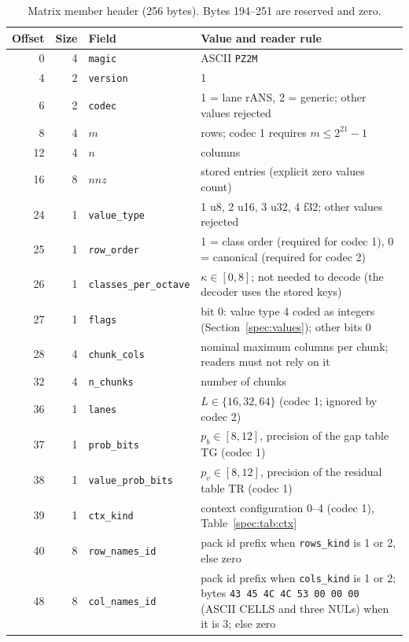 \begin{table}[htbp]
\centering\footnotesize\setlength{\tabcolsep}{4pt}
\caption{Matrix member header (256 bytes). Bytes 194--251 are reserved and zero.}
\label{spec:tab:pz2hdr}
\begin{tabularx}{\linewidth}{@{}rrlX@{}}
\toprule
Offset & Size & Field & Value and reader rule \\
\midrule
0   & 4  & \texttt{magic}   & ASCII \texttt{PZ2M} \\
4   & 2  & \texttt{version} & 1 \\
6   & 2  & \texttt{codec}   & 1 = lane rANS, 2 = generic; other values rejected \\
8   & 4  & $m$              & rows; codec 1 requires $m\le 2^{21}-1$ \\
12  & 4  & $n$              & columns \\
16  & 8  & $\mathit{nnz}$   & stored entries (explicit zero values count) \\
24  & 1  & \texttt{value\_type} & 1 u8, 2 u16, 3 u32, 4 f32; other values rejected \\
25  & 1  & \texttt{row\_order} & 1 = class order (required for codec 1), 0 = canonical (required for codec 2) \\
26  & 1  & \texttt{classes\_per\_octave} & $\kappa\in[0,8]$; not needed to decode (the decoder uses the stored keys) \\
27  & 1  & \texttt{flags}   & bit 0: value type 4 coded as integers (Section~\ref{spec:values}); other bits 0 \\
28  & 4  & \texttt{chunk\_cols} & nominal maximum columns per chunk; readers must not rely on it \\
32  & 4  & \texttt{n\_chunks} & number of chunks \\
36  & 1  & \texttt{lanes}   & $L\in\{16,32,64\}$ (codec 1; ignored by codec 2) \\
37  & 1  & \texttt{prob\_bits} & $p_b\in[8,12]$, precision of the gap table TG (codec 1) \\
38  & 1  & \texttt{value\_prob\_bits} & $p_v\in[8,12]$, precision of the residual table TR (codec 1) \\
39  & 1  & \texttt{ctx\_kind} & context configuration 0--4 (codec 1), Table~\ref{spec:tab:ctx} \\
40  & 8  & \texttt{row\_names\_id} & pack id prefix when \texttt{rows\_kind} is 1 or 2, else zero \\
48  & 8  & \texttt{col\_names\_id} & pack id prefix when \texttt{cols\_kind} is 1 or 2; bytes \texttt{43 45 4C 4C 53 00 00 00} (ASCII CELLS and three NULs) when it is 3; else zero \\

\end{tabularx}
\end{table}
